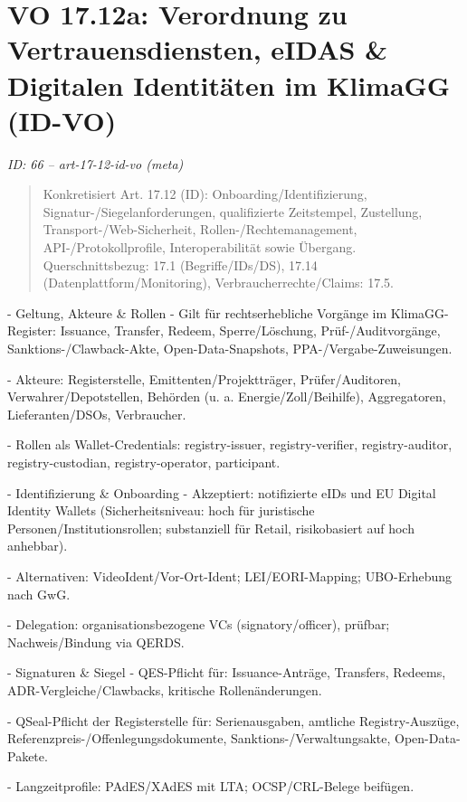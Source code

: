 \documentclass[12pt,a4paper]{scrartcl}
\begin{document}
\section[VO 17.12a: Verordnung zu Vertrauensdiensten, eIDAS \& Digitalen Identitäten im KlimaGG (ID-VO)]{VO 17.12a: Verordnung zu Vertrauensdiensten, eIDAS \& Digitalen Identitäten im KlimaGG (ID-VO)}
\noindent\textit{ID: 66 -- art-17-12-id-vo (meta)}

\begin{quote}
Konkretisiert Art. 17.12 (ID): Onboarding/Identifizierung, Signatur-/Siegelanforderungen, qualifizierte Zeitstempel, Zustellung, Transport-/Web-Sicherheit, Rollen-/Rechtemanagement, API-/Protokollprofile, Interoperabilität sowie Übergang. Querschnittsbezug: 17.1 (Begriffe/IDs/DS), 17.14 (Datenplattform/Monitoring), Verbraucherrechte/Claims: 17.5.
\end{quote}

- Geltung, Akteure \& Rollen
- Gilt für rechtserhebliche Vorgänge im KlimaGG-Register: Issuance, Transfer, Redeem, Sperre/Löschung, Prüf-/Auditvorgänge, Sanktions-/Clawback-Akte, Open-Data-Snapshots, PPA-/Vergabe-Zuweisungen.

- Akteure: Registerstelle, Emittenten/Projektträger, Prüfer/Auditoren, Verwahrer/Depotstellen, Behörden (u. a. Energie/Zoll/Beihilfe), Aggregatoren, Lieferanten/DSOs, Verbraucher.

- Rollen als Wallet-Credentials: registry-issuer, registry-verifier, registry-auditor, registry-custodian, registry-operator, participant.

- Identifizierung \& Onboarding
- Akzeptiert: notifizierte eIDs und EU Digital Identity Wallets (Sicherheitsniveau: hoch für juristische Personen/Institutionsrollen; substanziell für Retail, risikobasiert auf hoch anhebbar).

- Alternativen: VideoIdent/Vor-Ort-Ident; LEI/EORI-Mapping; UBO-Erhebung nach GwG.

- Delegation: organisationsbezogene VCs (signatory/officer), prüfbar; Nachweis/Bindung via QERDS.

- Signaturen \& Siegel
- QES-Pflicht für: Issuance-Anträge, Transfers, Redeems, ADR-Vergleiche/Clawbacks, kritische Rollenänderungen.

- QSeal-Pflicht der Registerstelle für: Serienausgaben, amtliche Registry-Auszüge, Referenzpreis-/Offenlegungsdokumente, Sanktions-/Verwaltungsakte, Open-Data-Pakete.

- Langzeitprofile: PAdES/XAdES mit LTA; OCSP/CRL-Belege beifügen.
\end{document}
